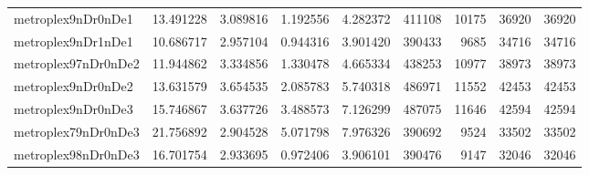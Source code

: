 \begin{longtable}{|l|r|r|r|r|r|r|r|r|}
metroplex9nDr0nDe1 & 13.491228 & 3.089816 & 1.192556 & 4.282372 & 411108 & 10175 & 36920 & 36920 \\
metroplex9nDr1nDe1 & 10.686717 & 2.957104 & 0.944316 & 3.901420 & 390433 & 9685 & 34716 & 34716 \\
metroplex97nDr0nDe2 & 11.944862 & 3.334856 & 1.330478 & 4.665334 & 438253 & 10977 & 38973 & 38973 \\
metroplex9nDr0nDe2 & 13.631579 & 3.654535 & 2.085783 & 5.740318 & 486971 & 11552 & 42453 & 42453 \\
metroplex9nDr0nDe3 & 15.746867 & 3.637726 & 3.488573 & 7.126299 & 487075 & 11646 & 42594 & 42594 \\
metroplex79nDr0nDe3 & 21.756892 & 2.904528 & 5.071798 & 7.976326 & 390692 & 9524 & 33502 & 33502 \\
metroplex98nDr0nDe3 & 16.701754 & 2.933695 & 0.972406 & 3.906101 & 390476 & 9147 & 32046 & 32046 \\
\end{longtable}
